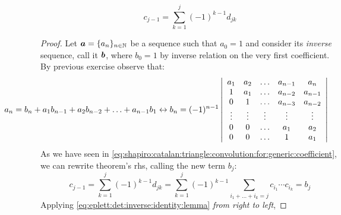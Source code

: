 \begin{theorem}
    \begin{displaymath}                
        c_{j-1}=\sum_{k=1}^{j}{(-1)^{k-1}d_{jk}}
    \end{displaymath}                
\end{theorem}
\begin{proof}
    Let $\boldsymbol{a}=\lbrace a_{n}\rbrace_{n\in\mathbb{N}}$ be a sequence such
    that $a_{0}=1$ and consider its \emph{inverse} sequence, call it $\boldsymbol{b}$,
    where $b_{0}=1$ by inverse relation on the very first coefficient.
    By previous exercise observe that:
    \begin{equation}                
        \hspace{-2cm}
        a_{n} = b_{n}+a_{1}b_{n-1}+a_{2}b_{n-2}+\ldots+a_{n-1}b_{1}
        \leftrightarrow
        b_{n} = (-1)^{n-1}
            \left|
            \begin{array}{ccccc}
                a_1 & a_2 & \ldots & a_{n-1} & a_{n}\\
                1 & a_1 & \ldots & a_{n-2} & a_{n-1}\\
                0   & 1 & \ldots & a_{n-3} & a_{n-2}\\
                \vdots & \vdots & \vdots & \vdots & \vdots\\
                0 & 0 & \ldots & a_{1} & a_{2}\\
                0 & 0 & \ldots & 1 & a_{1}\\
            \end{array}
            \right|
        \label{eq:eplett:det:inverse:identity:lemma}
    \end{equation}                
    As we have seen in
    \autoref{eq:shapiro:catalan:triangle:convolution:for:generic:coefficient}, 
    we can rewrite theorem's \ac{rhs}, calling the new term $b_{j}$:
    \begin{displaymath}                
        c_{j-1}=\sum_{k=1}^{j}{(-1)^{k-1}d_{jk}}
            = \sum_{k=1}^{j}{(-1)^{k-1}\sum_{i_{1}+\ldots+i_{k}=j}{c_{i_{1}}\cdots c_{i_{k}}}}=b_{j}
    \end{displaymath}                
    Applying \autoref{eq:eplett:det:inverse:identity:lemma} \emph{from right to left}, 

\end{proof}
